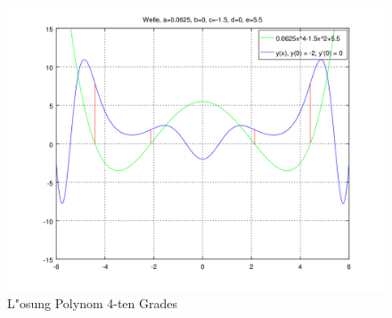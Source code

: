 \begin{figure}
	\includegraphics[scale=0.65]{./wellen/images/allgemein/n4.png}
	\caption{L"osung Polynom 4-ten Grades}
	\label{fig:wellen:poly4-dgl}
\end{figure}
